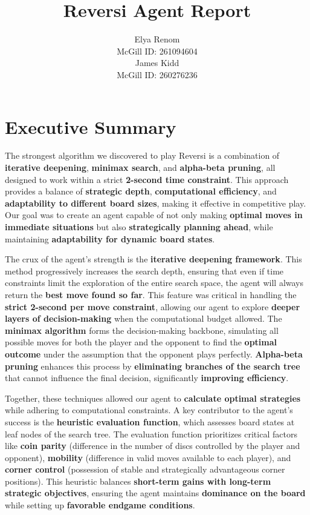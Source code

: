 \documentclass[11pt]{article}
\title{Reversi Agent Report}
\author{
    Elya Renom \\ 
    McGill ID: 261094604 \\[1em]
    James Kidd \\ 
    McGill ID: 260276236
}
\date{}
\begin{document}
\maketitle

\section*{Executive Summary}
The strongest algorithm we discovered to play Reversi is a combination of \textbf{iterative deepening}, \textbf{minimax search}, and \textbf{alpha-beta pruning}, all designed to work within a strict \textbf{2-second time constraint}. This approach provides a balance of \textbf{strategic depth}, \textbf{computational efficiency}, and \textbf{adaptability to different board sizes}, making it effective in competitive play. Our goal was to create an agent capable of not only making \textbf{optimal moves in immediate situations} but also \textbf{strategically planning ahead}, while maintaining \textbf{adaptability for dynamic board states}.

The crux of the agent's strength is the \textbf{iterative deepening framework}. This method progressively increases the search depth, ensuring that even if time constraints limit the exploration of the entire search space, the agent will always return the \textbf{best move found so far}. This feature was critical in handling the \textbf{strict 2-second per move constraint}, allowing our agent to explore \textbf{deeper layers of decision-making} when the computational budget allowed. The \textbf{minimax algorithm} forms the decision-making backbone, simulating all possible moves for both the player and the opponent to find the \textbf{optimal outcome} under the assumption that the opponent plays perfectly. \textbf{Alpha-beta pruning} enhances this process by \textbf{eliminating branches of the search tree} that cannot influence the final decision, significantly \textbf{improving efficiency}. 

Together, these techniques allowed our agent to \textbf{calculate optimal strategies} while adhering to computational constraints. A key contributor to the agent’s success is the \textbf{heuristic evaluation function}, which assesses board states at leaf nodes of the search tree. The evaluation function prioritizes critical factors like \textbf{coin parity} (difference in the number of discs controlled by the player and opponent), \textbf{mobility} (difference in valid moves available to each player), and \textbf{corner control} (possession of stable and strategically advantageous corner positions). This heuristic balances \textbf{short-term gains with long-term strategic objectives}, ensuring the agent maintains \textbf{dominance on the board} while setting up \textbf{favorable endgame conditions}.
\end{document}
